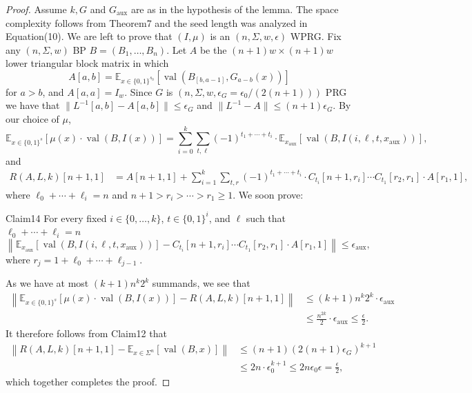 \begin{proof}
Assume $k,G$ and $G_{\mathrm{aux}}$ are as in the hypothesis of the lemma. The space complexity follows from Theorem7 and the seed length was analyzed in Equation(10). We are left to prove that $(I,\mu)$ is an $(n,\Sigma,w,\epsilon)$ WPRG. Fix any $(n,\Sigma,w)$ BP $B=(B_1,\ldots,B_n)$. Let $A$ be the $(n+1)w\times(n+1)w$ lower triangular block matrix in which
\[A[a,b]=\mathbb E_{x\in\{0,1\}^{s_0}}[\operatorname{val}(B_{[b,a-1]},G_{a-b}(x))]\]
for $a>b$, and $A[a,a]=I_w$. Since $G$ is $(n,\Sigma,w,\epsilon_G=\epsilon_0/(2(n+1)))$ PRG we have that $\|L^{-1}[a,b]-A[a,b]\|\le\epsilon_G$ and $\|L^{-1}-A\|\le(n+1)\epsilon_G$. By our choice of $\mu$,
\[\mathbb E_{x\in\{0,1\}^s}[\mu(x)\cdot\operatorname{val}(B,I(x))]=\sum_{i=0}^k\sum_{t,\ell}(-1)^{t_1+\cdots+t_i}\cdot\mathbb E_{x_{\mathrm{aux}}}[\operatorname{val}(B,I(i,\ell,t,x_{\mathrm{aux}}))],\]
and
\begin{align*}
R(A,L,k)[n+1,1]&=A[n+1,1]+\sum_{i=1}^k\sum_{t,r}(-1)^{t_1+\cdots+t_i}\cdot C_{t_i}[n+1,r_i]\cdots C_{t_1}[r_2,r_1]\cdot A[r_1,1],
\end{align*}
where $\ell_0+\cdots+\ell_i=n$ and $n+1>r_i>\cdots>r_1\ge1$. We soon prove:
\begin{authorclaim}{Claim14}
For every fixed $i\in\{0,\ldots,k\}$, $t\in\{0,1\}^i$, and $\ell$ such that $\ell_0+\cdots+\ell_i=n$
\[\left\|\mathbb E_{x_{\mathrm{aux}}}[\operatorname{val}(B,I(i,\ell,t,x_{\mathrm{aux}}))]-C_{t_i}[n+1,r_i]\cdots C_{t_1}[r_2,r_1]\cdot A[r_1,1]\right\|\le\epsilon_{\mathrm{aux}},\]
where $r_j=1+\ell_0+\cdots+\ell_{j-1}$.
\end{authorclaim}
As we have at most $(k+1)n^k2^k$ summands, we see that
\begin{align*}
\left\|\mathbb E_{x\in\{0,1\}^s}[\mu(x)\cdot\operatorname{val}(B,I(x))]-R(A,L,k)[n+1,1]\right\|
&\le(k+1)n^k2^k\cdot\epsilon_{\mathrm{aux}}\\
&\le\frac{n^{2k}}2\cdot\epsilon_{\mathrm{aux}}\le\frac\epsilon2.
\end{align*}
It therefore follows from Claim12 that
\begin{align*}
\left\|R(A,L,k)[n+1,1]-\mathbb E_{x\in\Sigma^n}[\operatorname{val}(B,x)]\right\|
&\le(n+1)(2(n+1)\epsilon_G)^{k+1}\\
&\le2n\cdot\epsilon_0^{k+1}\le2n\epsilon_0\epsilon=\frac\epsilon2,
\end{align*}
which together completes the proof.
\end{proof}
